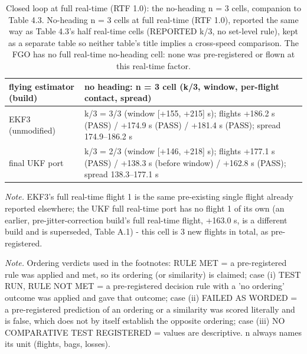 \begin{table}[htbp]
\centering
\footnotesize
\caption{Closed loop at full real-time (RTF 1.0): the no-heading n = 3 cells, companion to Table 4.3. No-heading n = 3 cells at full real-time (RTF 1.0), reported the same way as Table 4.3's half real-time cells (REPORTED k/3, no set-level rule), kept as a separate table so neither table's title implies a cross-speed comparison. The FGO has no full real-time no-heading cell: none was pre-registered or flown at this real-time factor.}
\label{tab:T4F}
\begin{tabular}{p{}p{}}
\toprule
\textbf{flying estimator (build)} & \textbf{no heading: n = 3 cell (k/3, window, per-flight contact, spread)} \\
\midrule
EKF3 (unmodified) & k/3 = 3/3 (window [+155, +215] s); flights +186.2 s (PASS) / +174.9 s (PASS) / +181.4 s (PASS); spread 174.9--186.2 s \\
final UKF port & k/3 = 2/3 (window [+146, +218] s); flights +177.1 s (PASS) / +138.3 s (before window) / +162.8 s (PASS); spread 138.3--177.1 s \\
\bottomrule
\end{tabular}
\par\smallskip\raggedright
\textit{Note.} EKF3's full real-time flight 1 is the same pre-existing single flight already reported elsewhere; the UKF full real-time port has no flight 1 of its own (an earlier, pre-jitter-correction build's full real-time flight, +163.0 s, is a different build and is superseded, Table A.1) - this cell is 3 new flights in total, as pre-registered.\par
\textit{Note.} Ordering verdicts used in the footnotes: RULE MET = a pre-registered rule was applied and met, so its ordering (or similarity) is claimed; case (i) TEST RUN, RULE NOT MET = a pre-registered decision rule with a 'no ordering' outcome was applied and gave that outcome; case (ii) FAILED AS WORDED = a pre-registered prediction of an ordering or a similarity was scored literally and is false, which does not by itself establish the opposite ordering; case (iii) NO COMPARATIVE TEST REGISTERED = values are descriptive. n always names its unit (flights, bags, losses).\par
\end{table}
